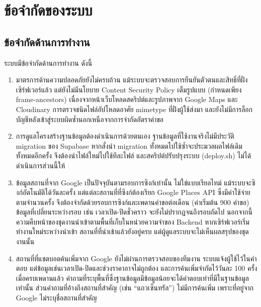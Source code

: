 \section{ข้อจำกัดของระบบ}

\subsection{ข้อจำกัดด้านการทำงาน}

ระบบมีข้อจำกัดด้านการทำงาน ดังนี้

\begingroup\listbreaksallowed
\begin{enumerate}
\item มาตรการด้านความปลอดภัยยังไม่ครบถ้วน แม้ระบบจะตรวจสอบการยืนยันตัวตนและสิทธิ์ที่ฝั่งเซิร์ฟเวอร์แล้ว แต่ยังไม่มีนโยบาย Content Security Policy เต็มรูปแบบ (กำหนดเพียง frame-ancestors) เนื่องจากหน้าเว็บโหลดสคริปต์และรูปภาพจาก Google Maps และ Cloudinary การตรวจชนิดไฟล์อัปโหลดอาศัย mimetype ที่ฝั่งผู้ใช้ส่งมา และยังไม่มีการล็อกบัญชีหลังเข้าสู่ระบบผิดซ้ำนอกเหนือจากการจำกัดอัตราคำขอ
\item การดูแลโครงสร้างฐานข้อมูลต้องดำเนินการด้วยตนเอง ฐานข้อมูลที่ใช้งานจริงไม่มีประวัติ migration ของ Supabase หากสั่งนำ migration ทั้งหมดไปใช้ซ้ำจะประมวลผลไฟล์เดิมทั้งหมดอีกครั้ง จึงต้องนำไฟล์ใหม่ไปใช้ทีละไฟล์ และสคริปต์ปรับปรุงระบบ (deploy.sh) ไม่ได้ดำเนินการส่วนนี้ให้
\item ข้อมูลสถานที่จาก Google เป็นปัจจุบันตามรอบการซิงก์เท่านั้น ไม่ใช่แบบเรียลไทม์ แม้ระบบจะซิงก์อัตโนมัติได้วันละครั้ง แต่แต่ละสถานที่ที่ซิงก์ต้องเรียก Google Places API ซึ่งมีค่าใช้จ่ายตามจำนวนครั้ง จึงต้องจำกัดด้วยรอบการซิงก์และเพดานคำขอต่อเดือน (ค่าเริ่มต้น 900 คำขอ) ข้อมูลที่เปลี่ยนระหว่างรอบ เช่น เวลาเปิด-ปิดชั่วคราว จะยังไม่ปรากฏจนถึงรอบถัดไป นอกจากนี้ ความคืบหน้าของชุดงานนำเข้าตามพื้นที่เก็บในหน่วยความจำของ Backend หากเซิร์ฟเวอร์เริ่มทำงานใหม่ระหว่างนำเข้า สถานที่ที่นำเข้าแล้วยังอยู่ครบ แต่ผู้ดูแลระบบจะไม่เห็นผลสรุปของชุดงานนั้น
\item สถานที่ที่แชตบอตค้นเพิ่มจาก Google ยังไม่ผ่านการตรวจสอบของทีมงาน ระบบแจ้งผู้ใช้ไว้ในคำตอบ แต่ข้อมูลเช่นเวลาเปิด-ปิดและช่วงราคาอาจไม่ถูกต้อง และการค้นเพิ่มจำกัดไว้วันละ 100 ครั้ง เมื่อครบเพดานแล้ว คำถามที่ระบุพื้นที่ซึ่งฐานข้อมูลมีข้อมูลน้อยจะได้คำตอบเท่าที่มีในฐานข้อมูลเท่านั้น ส่วนคำถามที่อ้างถึงสถานที่สำคัญ (เช่น ``แถวเซ็นทรัล'') ไม่มีการค้นเพิ่ม เพราะที่อยู่จาก Google ไม่ระบุชื่อสถานที่สำคัญ

\end{enumerate}
